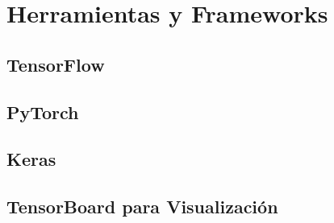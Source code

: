 \documentclass{book}
\begin{document}
\section{Herramientas y Frameworks}


\subsection{TensorFlow}
\newpage
\subsection{PyTorch}
\newpage
\subsection{Keras}
\newpage
\subsection{TensorBoard para Visualización}
\newpage
\end{document}
